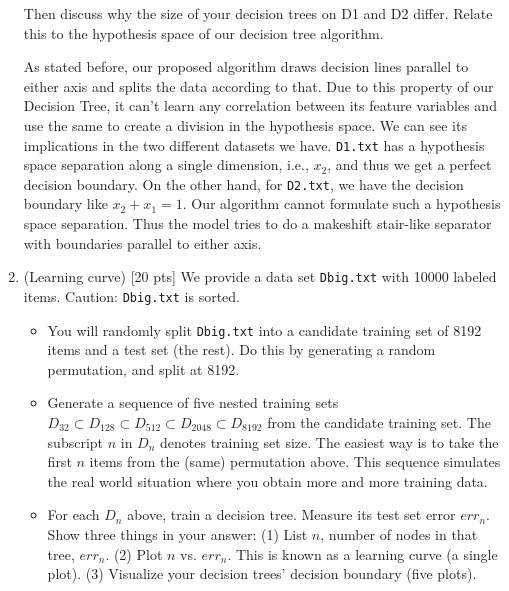 \documentclass[a4paper]{article}
\theoremstyle{definition}
\newenvironment{soln}{
    \leavevmode\color{blue}\ignorespaces
}{}
\begin{document}
\begin{enumerate}
\begin{itemize}
  \end{itemize}
Then discuss why the size of your decision trees on D1 and D2 differ.  Relate this to the hypothesis space of our decision tree algorithm. \\
\begin{soln}
    As stated before, our proposed algorithm draws decision lines parallel to either axis and splits the data according to that. Due to this property of our Decision Tree, it can't learn any correlation between its feature variables and use the same to create a division in the hypothesis space. We can see its implications in the two different datasets we have. \texttt{D1.txt} has a hypothesis space separation along a single dimension, i.e., $x_2$, and thus we get a perfect decision boundary. On the other hand, for \texttt{D2.txt}, we have the decision boundary like $x_2+x_1=1$. Our algorithm cannot formulate such a hypothesis space separation. Thus the model tries to do a makeshift stair-like separator with boundaries parallel to either axis. 
\end{soln}

\item (Learning curve)  [20 pts] We provide a data set \texttt{Dbig.txt} with 10000 labeled items.  Caution: \texttt{Dbig.txt} is sorted.
  \begin{itemize}
  
  \item You will randomly split \texttt{Dbig.txt} into a candidate training set of 8192 items and a test set (the rest).  Do this by generating a random permutation, and split at 8192.
  
  \item Generate a sequence of five nested training sets $D_{32} \subset D_{128} \subset D_{512} \subset D_{2048} \subset D_{8192}$ from the candidate training set.  The subscript $n$ in $D_n$ denotes training set size.  The easiest way is to take the first $n$ items from the (same) permutation above.  This sequence simulates the real world situation where you obtain more and more training data.
  
  \item For each $D_n$ above, train a decision tree.  Measure its test set error $err_n$.  Show three things in your answer: (1) List $n$, number of nodes in that tree, $err_n$. (2) Plot $n$ vs. $err_n$.  This is known as a learning curve (a single plot). (3) Visualize your decision trees' decision boundary (five plots). \\
  

\end{itemize}
\end{enumerate}
\end{document}
